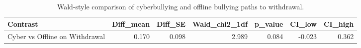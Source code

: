\begin{table}
\caption{Wald-style comparison of cyberbullying and offline bullying paths to withdrawal.}
\label{tab:wald}
\begin{tabular}{lrrrrrr}
\toprule
Contrast & Diff_mean & Diff_SE & Wald_chi2_1df & p_value & CI_low & CI_high \\
\midrule
Cyber vs Offline on Withdrawal & 0.170 & 0.098 & 2.989 & 0.084 & -0.023 & 0.362 \\
\bottomrule
\end{tabular}
\end{table}
